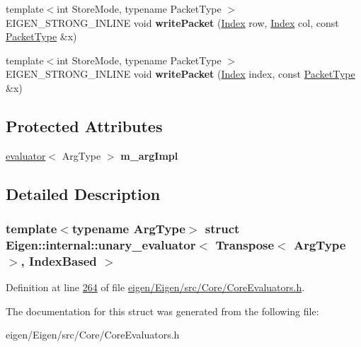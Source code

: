 \begin{DoxyCompactItemize}
{\footnotesize template$<$int Store\+Mode, typename Packet\+Type $>$ }\\E\+I\+G\+E\+N\+\_\+\+S\+T\+R\+O\+N\+G\+\_\+\+I\+N\+L\+I\+NE void {\bfseries write\+Packet} (\hyperlink{namespace_eigen_a62e77e0933482dafde8fe197d9a2cfde}{Index} row, \hyperlink{namespace_eigen_a62e77e0933482dafde8fe197d9a2cfde}{Index} col, const \hyperlink{struct_eigen_1_1_packet_type}{Packet\+Type} \&x)
\item 
\mbox{\label{struct_eigen_1_1internal_1_1unary__evaluator_3_01_transpose_3_01_arg_type_01_4_00_01_index_based_01_4_a5850cde3386d111a5d4dd20a8b5cf27c}} 
{\footnotesize template$<$int Store\+Mode, typename Packet\+Type $>$ }\\E\+I\+G\+E\+N\+\_\+\+S\+T\+R\+O\+N\+G\+\_\+\+I\+N\+L\+I\+NE void {\bfseries write\+Packet} (\hyperlink{namespace_eigen_a62e77e0933482dafde8fe197d9a2cfde}{Index} index, const \hyperlink{struct_eigen_1_1_packet_type}{Packet\+Type} \&x)
\end{DoxyCompactItemize}
\subsection*{Protected Attributes}
\begin{DoxyCompactItemize}
\item 
\mbox{\label{struct_eigen_1_1internal_1_1unary__evaluator_3_01_transpose_3_01_arg_type_01_4_00_01_index_based_01_4_ad1a04dade540683c9e92ebe3a1b89be6}} 
\hyperlink{struct_eigen_1_1internal_1_1evaluator}{evaluator}$<$ Arg\+Type $>$ {\bfseries m\+\_\+arg\+Impl}
\end{DoxyCompactItemize}


\subsection{Detailed Description}
\subsubsection*{template$<$typename Arg\+Type$>$\newline
struct Eigen\+::internal\+::unary\+\_\+evaluator$<$ Transpose$<$ Arg\+Type $>$, Index\+Based $>$}



Definition at line \hyperlink{eigen_2_eigen_2src_2_core_2_core_evaluators_8h_source_l00264}{264} of file \hyperlink{eigen_2_eigen_2src_2_core_2_core_evaluators_8h_source}{eigen/\+Eigen/src/\+Core/\+Core\+Evaluators.\+h}.



The documentation for this struct was generated from the following file\+:\begin{DoxyCompactItemize}
\item 
eigen/\+Eigen/src/\+Core/\+Core\+Evaluators.\+h\end{DoxyCompactItemize}
